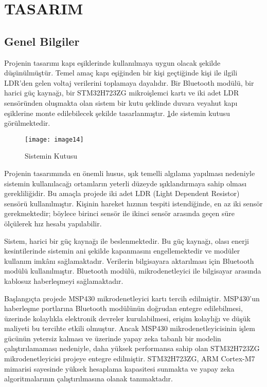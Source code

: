 \section{TASARIM}

\subsection{Genel Bilgiler}

Projenin tasarımı kapı eşiklerinde kullanılmaya uygun olacak şekilde düşünülmüştür. Temel amaç kapı eşiğinden bir kişi geçtiğinde kişi ile ilgili LDR'den gelen voltaj verilerini toplamaya dayalıdır. Bir Bluetooth modülü, bir harici güç kaynağı, bir STM32H723ZG mikroişlemci kartı ve iki adet LDR sensöründen oluşmakta olan sistem bir kutu şeklinde duvara veyahut kapı eşiklerine monte edilebilecek şekilde tasarlanmıştır. \ref{fig:mickutu}de sistemin kutusu görülmektedir.


\begin{figure}[H]
    \centering
    \texttt{[image: image14]}
    \caption{Sistemin Kutusu}
    \label{fig:mickutu}
\end{figure}


Projenin tasarımında en önemli husus, ışık temelli algılama yapılması nedeniyle sistemin kullanılacağı ortamların yeterli düzeyde ışıklandırmaya sahip olması gerekliliğidir. Bu amaçla projede iki adet LDR (Light Dependent Resistor) sensörü kullanılmıştır. Kişinin hareket hızının tespiti istendiğinde, en az iki sensör gerekmektedir; böylece birinci sensör ile ikinci sensör arasında geçen süre ölçülerek hız hesabı yapılabilir.

Sistem, harici bir güç kaynağı ile beslenmektedir. Bu güç kaynağı, olası enerji kesintilerinde sistemin ani şekilde kapanmasını engellemektedir ve modüler kullanım imkânı sağlamaktadır. Verilerin bilgisayara aktarılması için Bluetooth modülü kullanılmıştır. Bluetooth modülü, mikrodenetleyici ile bilgisayar arasında kablosuz haberleşmeyi sağlamaktadır.

Başlangıçta projede MSP430 mikrodenetleyici kartı tercih edilmiştir. MSP430'un haberleşme portlarına Bluetooth modülünün doğrudan entegre edilebilmesi, üzerinde kolaylıkla elektronik devreler kurulabilmesi, erişim kolaylığı ve düşük maliyeti bu tercihte etkili olmuştur. Ancak MSP430 mikrodenetleyicisinin işlem gücünün yetersiz kalması ve üzerinde yapay zeka tabanlı bir modelin çalıştırılamaması nedeniyle, daha yüksek performansa sahip olan STM32H723ZG mikrodenetleyicisi projeye entegre edilmiştir. STM32H723ZG, ARM Cortex-M7 mimarisi sayesinde yüksek hesaplama kapasitesi sunmakta ve yapay zeka algoritmalarının çalıştırılmasına olanak tanımaktadır.

